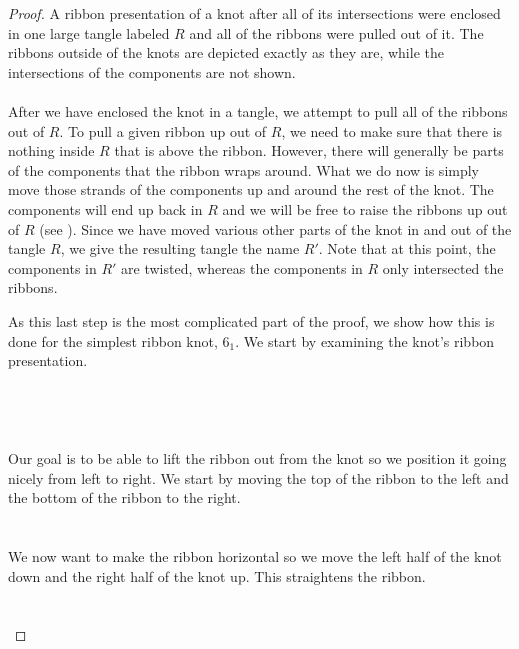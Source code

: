 \documentclass{ws-jktr}
\begin{document}
\begin{proof}
{A ribbon presentation of a knot after all of its intersections were enclosed in
one large tangle labeled $R$ and all of the ribbons were pulled out of it.
The ribbons outside of the knots are depicted exactly as they are, while the
intersections of the components are not shown.}\\\\

After we have enclosed the knot in a tangle, we attempt to pull all of the
ribbons out of $R$.
To pull a given ribbon up out of $R$, we need to make sure that there is nothing
inside $R$ that is above the ribbon.
However, there will generally be parts of the components that the ribbon wraps
around.
What we do now is simply move those strands of the components up and around the
rest of the knot.
The components will end up back in $R$ and we will be free to raise the ribbons
up out of $R$ (see \figTwisted).
Since we have moved various other parts of the knot in and out of the tangle
$R$, we give the resulting tangle the name $R'$.
Note that at this point, the components in $R'$ are twisted, whereas the
components in $R$ only intersected the ribbons.

As this last step is the most complicated part of the proof, we show how this is
done for the simplest ribbon knot, $6_1$.
We start by examining the knot's ribbon presentation.\\\\\\

\\\\

Our goal is to be able to lift the ribbon out from the knot so we position it
going nicely from left to right.
We start by moving the top of the ribbon to the left and the bottom of the
ribbon to the right.\\

\\\\

We now want to make the ribbon horizontal so we move the left half of the knot
down and the right half of the knot up.
This straightens the ribbon.\\

\\\\


\end{proof}
\end{document}
